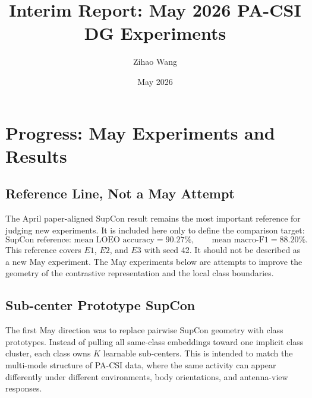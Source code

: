 \documentclass[11pt]{article}
\title{Interim Report: May 2026 PA-CSI DG Experiments}
\author{Zihao Wang}
\date{May 2026}
\begin{document}
\maketitle

\section{Progress: May Experiments and Results}

\subsection{Reference Line, Not a May Attempt}

The April paper-aligned SupCon result remains the most important reference for judging new experiments. It is included here only to define the comparison target:
\[
\text{SupCon reference: mean LOEO accuracy}=90.27\%,\qquad
\text{mean macro-F1}=88.20\%.
\]
This reference covers $E1$, $E2$, and $E3$ with seed 42. It should not be described as a new May experiment. The May experiments below are attempts to improve the geometry of the contrastive representation and the local class boundaries.

\subsection{Sub-center Prototype SupCon}

The first May direction was to replace pairwise SupCon geometry with class prototypes. Instead of pulling all same-class embeddings toward one implicit class cluster, each class owns $K$ learnable sub-centers. This is intended to match the multi-mode structure of PA-CSI data, where the same activity can appear differently under different environments, body orientations, and antenna-view responses.

\begin{table}[H]
\centering
\small
\caption{May sub-center prototype screening on target $E2$, seed 42.}
\label{tab:subcenter_screen}
%
\end{table}
\end{document}
